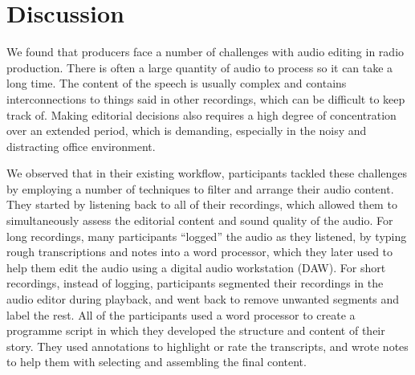 



\section{Discussion}\label{sec:screen-discussion}
We found that producers face a number of challenges with audio editing in radio production. There is often a large
quantity of audio to process so it can take a long time. The content of the speech is usually complex and contains
interconnections to things said in other recordings, which can be difficult to keep track of. Making editorial
decisions also requires a high degree of concentration over an extended period, which is demanding, especially in the
noisy and distracting office environment.

We observed that in their existing workflow, participants tackled these challenges by employing a number of techniques
to filter and arrange their audio content. They started by listening back to all of their recordings, which allowed
them to simultaneously assess the editorial content and sound quality of the audio. For long recordings, many
participants ``logged'' the audio as they listened, by typing rough transcriptions and notes into a word processor, which
they later used to help them edit the audio using a digital audio workstation (DAW). For short recordings, instead of
logging, participants segmented their recordings in the audio editor during playback, and went back to remove unwanted
segments and label the rest.
All of the participants used a word processor to create a programme script in which they developed the structure and
content of their story. They used annotations to highlight or rate the transcripts, and wrote notes to help them with
selecting and assembling the final content.

